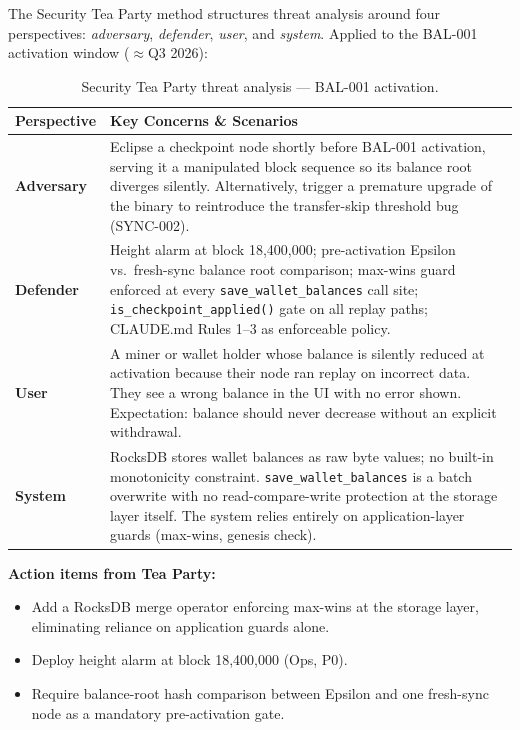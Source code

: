 \documentclass[12pt,a4paper]{article}
\begin{document}
The Security Tea Party method structures threat analysis around four
perspectives: \emph{adversary}, \emph{defender}, \emph{user}, and \emph{system}.
Applied to the BAL-001 activation window ($\approx$Q3 2026):

\begin{table}[H]
\centering
\small
\renewcommand{\arraystretch}{1.3}
\begin{tabularx}{\linewidth}{lX}
\toprule
\textbf{Perspective} & \textbf{Key Concerns \& Scenarios} \\
\midrule
\textbf{Adversary} &
  Eclipse a checkpoint node shortly before BAL-001 activation, serving it a
  manipulated block sequence so its balance root diverges silently.
  Alternatively, trigger a premature upgrade of the binary to reintroduce the
  transfer-skip threshold bug (SYNC-002). \\
\rowcolor{rowgray}
\textbf{Defender} &
  Height alarm at block 18,400,000; pre-activation Epsilon vs.\ fresh-sync
  balance root comparison; max-wins guard enforced at every
  \texttt{save\_wallet\_balances} call site; \texttt{is\_checkpoint\_applied()}
  gate on all replay paths; CLAUDE.md Rules 1--3 as enforceable policy. \\
\textbf{User} &
  A miner or wallet holder whose balance is silently reduced at activation because
  their node ran replay on incorrect data. They see a wrong balance in the UI
  with no error shown. Expectation: balance should never decrease without an
  explicit withdrawal. \\
\rowcolor{rowgray}
\textbf{System} &
  RocksDB stores wallet balances as raw byte values; no built-in monotonicity
  constraint. \texttt{save\_wallet\_balances} is a batch overwrite with no
  read-compare-write protection at the storage layer itself. The system relies
  entirely on application-layer guards (max-wins, genesis check). \\
\bottomrule
\end{tabularx}
\caption{Security Tea Party threat analysis --- BAL-001 activation.}
\end{table}

\textbf{Action items from Tea Party:}
\begin{itemize}[leftmargin=*,itemsep=1pt]
  \item Add a RocksDB merge operator enforcing max-wins at the storage layer,
    eliminating reliance on application guards alone.
  \item Deploy height alarm at block 18,400,000 (Ops, P0).
  \item Require balance-root hash comparison between Epsilon and one fresh-sync
    node as a mandatory pre-activation gate.
\end{itemize}
\end{document}

